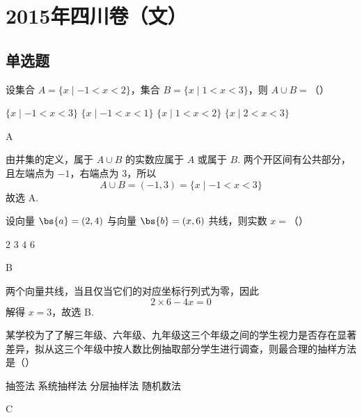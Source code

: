 \chapter{2015年四川卷（文）}

\section{单选题}

\begin{problem}
设集合 \(A = \{x \mid -1 < x < 2\}\)，集合 \(B = \{x \mid 1 < x < 3\}\)，则 \(A \cup B=\)（\quad）

\choices
    {\(\{x\mid -1 < x < 3\}\)}
    {\(\{x\mid -1 < x < 1\}\)}
    {\(\{x\mid 1 < x < 2\}\)}
    {\(\{x\mid 2 < x < 3\}\)}
\end{problem}

\begin{answer}
A
\end{answer}

\begin{solution}
由并集的定义，属于 \(A\cup B\) 的实数应属于 \(A\) 或属于 \(B\). 两个开区间有公共部分，且左端点为 \(-1\)，右端点为 \(3\)，所以
\[
A\cup B=(-1,3)=\{x\mid -1<x<3\}
\]
故选 A.
\end{solution}

\begin{problem}
设向量 \(\bs{a} = (2,4)\) 与向量 \(\bs{b} = (x,6)\) 共线，则实数 \(x =\)（\quad）

\choices
    {\(2\)}
    {\(3\)}
    {\(4\)}
    {\(6\)}
\end{problem}

\begin{answer}
B
\end{answer}

\begin{solution}
两个向量共线，当且仅当它们的对应坐标行列式为零，因此
\[
2\times 6-4x=0
\]
解得 \(x=3\)，故选 B.
\end{solution}

\begin{problem}
某学校为了了解三年级、六年级、九年级这三个年级之间的学生视力是否存在显著差异，拟从这三个年级中按人数比例抽取部分学生进行调查，则最合理的抽样方法是（\quad）

\choices
    {抽签法}
    {系统抽样法}
    {分层抽样法}
    {随机数法}
\end{problem}

\begin{answer}
C
\end{answer}

